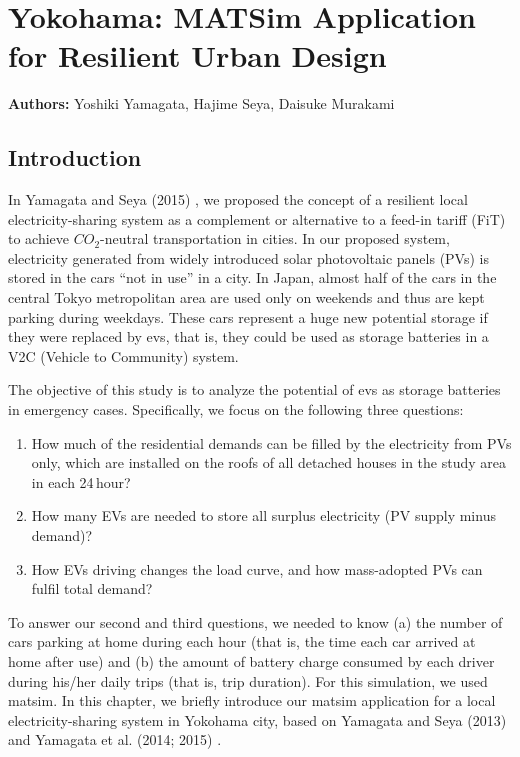 \chapter{Yokohama: MATSim Application for Resilient Urban Design}
\label{ch:yokohama}
\hfill \textbf{Authors:} Yoshiki Yamagata, Hajime Seya, Daisuke Murakami

\section{Introduction}
In Yamagata and Seya (2015) \citet[][]{}, we proposed the concept of a resilient local electricity-sharing system as a complement or alternative to a feed-in tariff (FiT) to achieve $CO_2$-neutral transportation in cities. In our proposed system, electricity generated from widely introduced solar photovoltaic panels (PVs)  is stored in the cars ``not in use'' in a city. In Japan, almost half of the cars in the central Tokyo metropolitan area are used only on weekends and thus are kept parking during weekdays. These cars represent a huge new potential storage if they were replaced by \glspl{ev}, that is, they could be used as storage batteries in a V2C (Vehicle to Community)  system. 

The objective of this study is to analyze the potential of \glspl{ev} as storage batteries in emergency cases. Specifically, we focus on the following three questions: 
\begin{enumerate}\styleEnumerate
\item How much of the residential demands can be filled by the electricity from PVs only, which are installed on the roofs of all detached houses in the study area in each 24\,hour? 
\item How many EVs are needed to store all surplus electricity (PV supply minus demand)?
\item How EVs driving changes the load curve, and how mass-adopted PVs can fulfil total demand? 
\end{enumerate}
To answer our second and third questions, we needed to know (a) the number of cars parking at home during each hour (that is, the time each car arrived at home after use) and (b) the amount of battery charge consumed by each driver during his/her daily trips (that is, trip duration). For this simulation, we used \gls{matsim}. In this chapter, we briefly introduce our \gls{matsim} application for a local electricity-sharing system in Yokohama city, based on Yamagata and Seya (2013) and Yamagata et al. (2014; 2015) \citet[][]{}.

